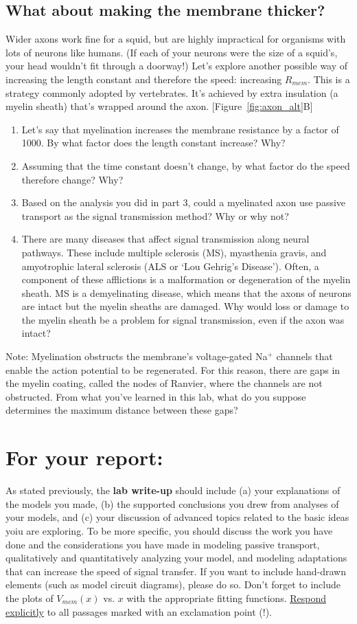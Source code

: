 \subsection*{What about making the membrane thicker?}
Wider axons work fine for a squid, but are highly impractical for organisms with lots of neurons like humans.
(If each of your neurons were the size of a squid's, your head wouldn't fit through a doorway!)
Let's explore another possible way of increasing the length constant and therefore the speed: increasing $R_{mem}$.
This is a strategy commonly adopted by vertebrates.
It's achieved by extra insulation (a myelin sheath) that's wrapped around the axon. [Figure~\ref{fig:axon_alt}B]
\begin{enumerate}
\itemsep-0.2em
\item Let's say that myelination increases the membrane resistance by a factor of 1000. By what factor does the length constant increase? Why?
\item Assuming that the time constant doesn't change, by what factor do the speed therefore change? Why?
\item Based on the analysis you did in part 3, could a myelinated axon use passive transport as the signal transmission method? Why or why not?
\item There are many diseases that affect signal transmission along neural pathways. These include multiple sclerosis (MS), myasthenia gravis, and amyotrophic lateral sclerosis (ALS or `Lou Gehrig's Disease'). Often, a component of these afflictions is a malformation or degeneration of the myelin sheath. MS is a demyelinating disease, which means that the axons of neurons are intact but the myelin sheaths are damaged. Why would loss or damage to the myelin sheath be a problem for signal transmission, even if the axon was intact?
\end{enumerate}
Note: Myelination obstructs the membrane's voltage-gated Na$^{+}$ channels that enable the action potential to be regenerated.
For this reason, there are gaps in the myelin coating, called the nodes of Ranvier, where the channels are not obstructed.
From what you've learned in this lab, what do you suppose determines the maximum distance between these gaps?

\section*{For your report:}
As stated previously, the \textbf{lab write-up} should include (a) your explanations of the models you made, (b) the supported conclusions you drew from analyses of your models, and (c) your discussion of advanced topics related to the basic ideas yoiu are exploring.
To be more specific, you should discuss the work you have done and the considerations you have made in modeling passive transport, qualitatively and quantitatively analyzing your model, and modeling adaptations that can increase the speed of signal transfer.
If you want to include hand-drawn elements (such as model circuit diagrams), please do so.
Don't forget to include the plots of $V_{mem}(x)$ vs. $x$ with the appropriate fitting functions. 
\underline{Respond explicitly} to all passages marked with an exclamation point (!).
